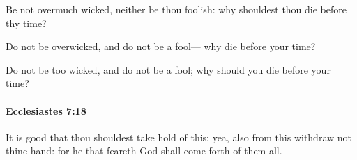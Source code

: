 			\begin{versebox}
					\item[BHS] 
					\item[LXX] 
					\item[ASV] Be not overmuch wicked, neither be thou foolish: why shouldest thou die before thy time?
					\item[NIV] Do not be overwicked, and do not be a fool— why die before your time?
					\item[NRSV] Do not be too wicked, and do not be a fool; why should you die before your time?
			\end{versebox}

		\paragraph{Ecclesiastes 7:18} %
			\label{ECCLESIASTES-7-18}

			It is good that thou shouldest take hold of this; yea, also from this withdraw not thine hand: for he that feareth God shall come forth of them all.

